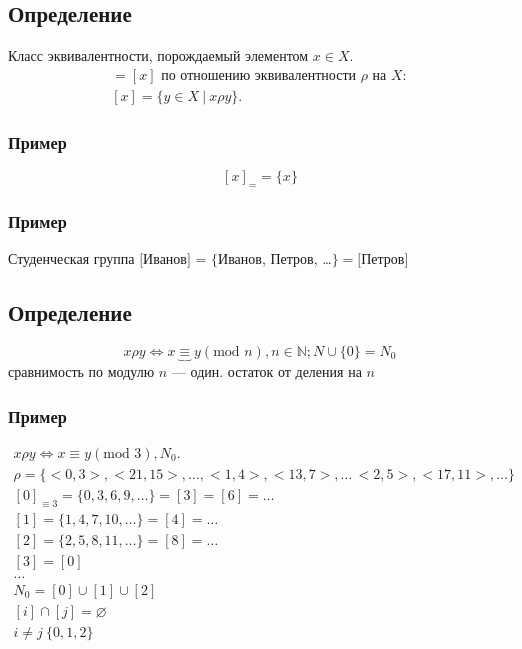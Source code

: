 \documentclass{article}
\begin{document}
\subsection{Определение}
Класс эквивалентности, порождаемый элементом $x \in X$.
\begin{gather*}
    [x_p] = [x] \text{ по отношению эквивалентности } \rho \text{ на } X: \\
    [x] = \{y \in X~|~x\rho y\}.
\end{gather*}

\subsubsection{Пример}
\[
    [x]_= =\{x\}
\]

\subsubsection{Пример}
Студенческая группа
$[$Иванов$]$ = $\{$Иванов, Петров, \dots$\} = [$Петров$]$


\subsection{Определение}
\[
    x \rho y \Leftrightarrow x \underbrace{\equiv} y(\text{mod } n), n \in \mathbb{N}; N \cup \{0\} = N_0
\]
сравнимость по модулю $n$ --- один. остаток от деления на $n$

\subsubsection{Пример}
\begin{gather*}
    x \rho y \Leftrightarrow x \equiv y (\text{mod } 3), N_0. \\
    \rho = \{ <0, 3>, <21, 15>, \dots, <1, 4>, <13, 7>, \dots\, <2, 5>, <17, 11>, \dots\} \\
    [0]_{\equiv 3} = \{0, 3, 6, 9, \dots\} = [3] = [6] = \dots \\
    [1] = \{1, 4, 7, 10, \dots\} = [4] = \dots \\
    [2] = \{2, 5, 8, 11, \dots\} = [8] = \dots \\
    [3] = [0] \\
    \dots \\
    N_0 = [0] \cup [1] \cup [2] \\
    [i] \cap [j] = \varnothing \\
    i \neq j ~ \{0, 1, 2\}
\end{gather*}
\end{document}

